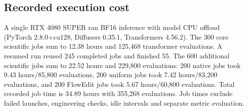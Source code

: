 \subsection{Recorded execution cost}
A single RTX 4080 SUPER ran BF16 inference with model CPU offload (PyTorch 2.8.0+cu128, Diffusers 0.35.1, Transformers 4.56.2). The 300 core scientific jobs sum to 12.38 hours and 125,468 transformer evaluations. A resumed run reused 245 completed jobs and finished 55. The 600 additional scientific jobs sum to 22.52 hours and 229,800 evaluations: 200 native jobs took 9.43 hours/85,800 evaluations, 200 uniform jobs took 7.42 hours/83,200 evaluations, and 200 FlowEdit jobs took 5.67 hours/60,800 evaluations. Total recorded job time is 34.89 hours with 355,268 evaluations. Job times exclude failed launches, engineering checks, idle intervals and separate metric evaluation.
